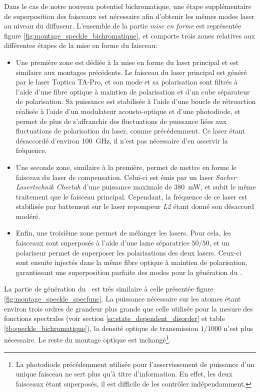 Dans le cas de notre nouveau potentiel bichromatique, une étape supplémentaire de superposition des faisceaux est nécessaire afin d'obtenir les mêmes modes laser au niveau du diffuseur. L'ensemble de la partie \emph{mise en forme} est représentée figure \ref{fig:montage_speckle_bichromatique}, et comporte trois zones relatives aux différentes étapes de la mise en forme du faisceau:
\begin{itemize}
\item[\textendash] Une première zone est dédiée à la mise en forme du laser principal et est similaire aux montages précédents. Le faisceau du laser principal est généré par le laser Toptica TA-Pro, et son mode et sa polarisation sont filtrés à l'aide d'une fibre optique à maintien de polarisation et d'un cube séparateur de polarisation. Sa puissance est stabilisée à l'aide d'une boucle de rétroaction réalisée à l'aide d'un modulateur acousto-optique et d'une photodiode, et permet de plus de s'affranchir des fluctuations de puissance liées aux fluctuations de polarisation du laser, comme précédemment. Ce laser étant désaccordé d'environ \SI{100}{\giga\hertz}, il n'est pas nécessaire d'en asservir la fréquence.
\item[\textendash] Une seconde zone, similaire à la première, permet de mettre en forme le faisceau du laser de compensation. Celui-ci est émis par un laser \emph{Sacher Lasertechnik Cheetah} d'une puissance maximale de \SI{380}{\milli\watt}, et subit le même traitement que le faisceau principal. Cependant, la fréquence de ce laser est stabilisée par battement sur le laser repompeur \emph{L2} étant donné son désaccord modéré.
\item[\textendash] Enfin, une troisième zone permet de mélanger les lasers. Pour cela, les faisceaux sont superposés à l'aide d'une lame séparatrice $50/50$, et un polariseur permet de superposer les polarisations des deux lasers. Ceux-ci sont ensuite injectés dans la même fibre optique à maintien de polarisation, garantissant une superposition parfaite des modes pour la génération du \speckle .
\end{itemize}


La partie de génération du \speckle\ est très similaire à celle présentée figure \ref{fig:montage_speckle_specfunc}. La puissance nécessaire sur les atomes étant environ trois ordres de grandeur plus grande que celle utilisée pour la mesure des fonctions spectrales (voir section \ref{sc:state_dependent_disorder} et table \ref{tb:speckle_bichromatique}), la densité optique de transmission $1/1000$ n'est plus nécessaire. Le reste du montage optique est inchangé\footnote{La photodiode précédemment utilisée pour l'asservissement de puissance d'un unique faisceau ne sert plus qu'à titre d'information. En effet, les deux faisceaux étant superposés, il est difficile de les contrôler indépendamment.}.
